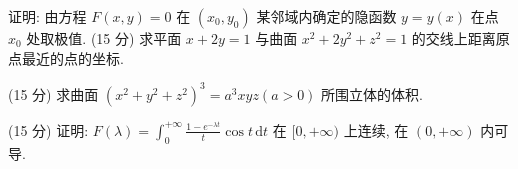 证明: 由方程 $F(x, y) = 0$ 在 $(x_0, y_0)$ 某邻域内确定的隐函数 $y = y(x)$ 在点 $x_0$ 处取极值.
(15 分) 求平面 $x + 2y = 1$ 与曲面 $x^2 + 2y^2 + z^2 = 1$ 的交线上距离原点最近的点的坐标.\par
\par{}
(15 分) 求曲面 $(x^{2} + y^{2} + z^{2})^{3} = a^{3}xyz (a > 0)$ 所围立体的体积.\par
\par{}
(15 分) 证明: $F(\lambda) = \int_{0}^{+\infty} \frac{1 - e^{-\lambda t}}{t} \cos t \, \mathrm{d}t$ 在 $[0, +\infty)$ 上连续, 在 $(0, +\infty)$ 内可导.\par
